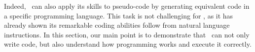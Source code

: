 Indeed,  \DV \ can also apply its skills to pseudo-code by generating equivalent code in a specific programming language. This task is not challenging for \DV , as it has already shown its remarkable coding abilities follow from natural language instructions. In this section, our main point is to demonstrate that \DV \ can not only write code, but also understand how programming works and execute it correctly.


